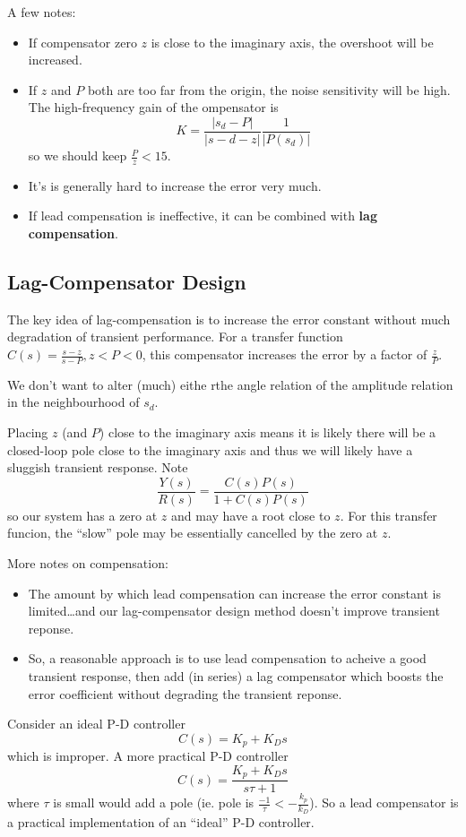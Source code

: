 \documentclass[12pt]{article}
\begin{document}
A few notes:
\begin{itemize}
\item If compensator zero $z$ is close to the imaginary axis, the overshoot will be increased.
\item If $z$ and $P$ both are too far from the origin, the noise sensitivity will be high. The high-frequency gain of the ompensator is \[ K = \frac{|s_d - P|}{|s-d - z|} \frac{1}{|P(s_d)|} \] so we should keep $\frac{P}{z} < 15$.
\item It's is generally hard to increase the error very much.
\item If lead compensation is ineffective, it can be combined with {\bf lag compensation}.
\end{itemize}

\subsection{Lag-Compensator Design}
The key idea of lag-compensation is to increase the error constant without much degradation of transient performance. For a transfer function $C(s) = \frac{s-z}{s-P}, z < P < 0$, this compensator increases the error by a factor of $\frac{z}{P}$.

We don't want to alter (much) eithe rthe angle relation of the amplitude relation in the neighbourhood of $s_d$.

Placing $z$ (and $P$) close to the imaginary axis means it is likely there will be a closed-loop pole close to the imaginary axis and thus we will likely have a sluggish transient response. Note \[ \frac{Y(s)}{R(s)} = \frac{C(s)P(s)}{1 + C(s)P(s)} \] so our system has a zero at $z$ and may have a root close to $z$. For this transfer funcion, the ``slow'' pole may be essentially cancelled by the zero at $z$.

More notes on compensation:
\begin{itemize}
\item The amount by which lead compensation can increase the error constant is limited\dots and our lag-compensator design method doesn't improve transient reponse.
\item So, a reasonable approach is to use lead compensation to acheive a good transient response, then add (in series) a lag compensator which boosts the error coefficient without degrading the transient reponse.
\end{itemize}

Consider an ideal P-D controller \[ C(s) = K_p + K_Ds \] which is improper. A more practical P-D controller \[ C(s) = \frac{K_p + K_Ds}{s\tau + 1} \] where $\tau$ is small would add a pole (ie. pole is $\frac{-1}{\tau} < -\frac{k_p}{k_D}$). So a lead compensator is a practical implementation of an ``ideal'' P-D controller.
\end{document}
